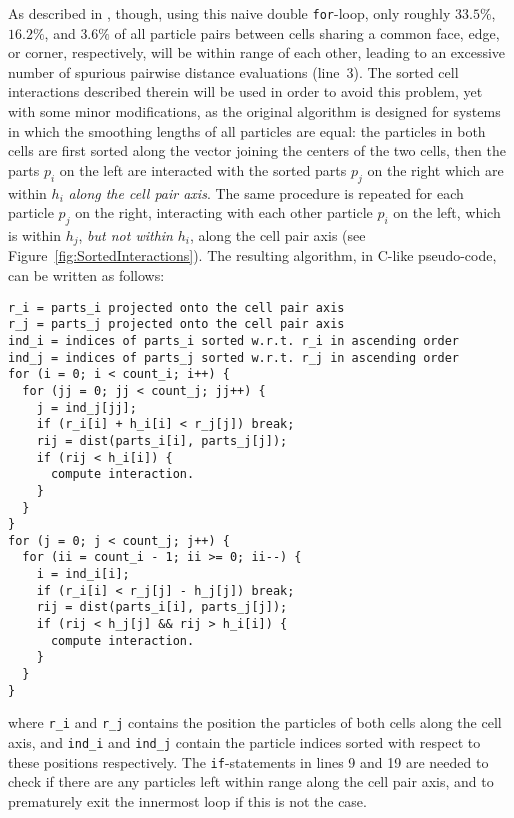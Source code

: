 \documentclass[final]{siamltex}
\newcommand{\fig}[1]
    {Figure~\ref{fig:#1}}
\begin{document}
As described in \cite{ref:Gonnet2007}, though, using this
naive double {\tt for}-loop, only roughly $33.5\%$, $16.2\%$,
and $3.6\%$ of all particle
pairs between cells sharing a common face, edge, or corner, respectively,
will be within range of each other, leading
to an excessive number of spurious pairwise distance evaluations (line~3).
The sorted cell interactions described therein will be used in order to
avoid this problem, yet with some minor modifications, as
the original algorithm is designed for systems in which the
smoothing lengths of all particles are equal:
the particles in both cells are first sorted along the vector joining
the centers of the two cells, then the
parts $p_i$ on the left are interacted with the sorted parts $p_j$
on the right which are within $h_i$ {\em along the cell pair axis}.
The same procedure is repeated for each particle $p_j$ on the
right, interacting with each other particle $p_i$ on the
left, which is within $h_j$, {\em but not within} $h_i$, along
the cell pair axis (see \fig{SortedInteractions}).
The resulting algorithm, in C-like pseudo-code, can be written as follows:
        
\begin{center}\begin{minipage}{0.8\textwidth}
    \begin{lstlisting}
r_i = parts_i projected onto the cell pair axis
r_j = parts_j projected onto the cell pair axis
ind_i = indices of parts_i sorted w.r.t. r_i in ascending order
ind_j = indices of parts_j sorted w.r.t. r_j in ascending order
for (i = 0; i < count_i; i++) {
  for (jj = 0; jj < count_j; jj++) {
    j = ind_j[jj];
    if (r_i[i] + h_i[i] < r_j[j]) break;
    rij = dist(parts_i[i], parts_j[j]);
    if (rij < h_i[i]) {
      compute interaction.
    }
  }
}
for (j = 0; j < count_j; j++) {
  for (ii = count_i - 1; ii >= 0; ii--) {
    i = ind_i[i];
    if (r_i[i] < r_j[j] - h_j[j]) break;
    rij = dist(parts_i[i], parts_j[j]);
    if (rij < h_j[j] && rij > h_i[i]) {
      compute interaction.
    }
  }
}
    \end{lstlisting}
\end{minipage}\end{center}
        
\noindent where {\tt r\_i} and {\tt r\_j} contains the position
the particles of both cells along the cell axis, and
{\tt ind\_i} and {\tt ind\_j} contain the particle indices
sorted with respect to these positions respectively.
The {\tt if}-statements in lines 9 and 19 are needed to check
if there are any particles left within range along the cell
pair axis, and to prematurely exit the innermost loop if
this is not the case.
\end{document}

